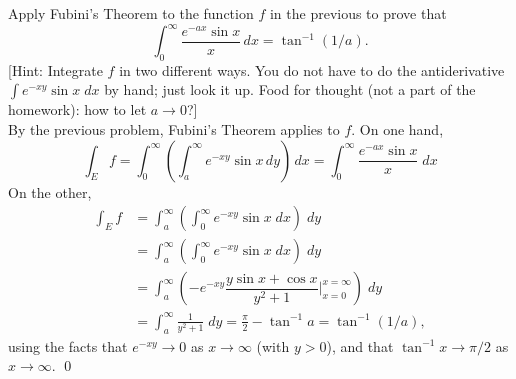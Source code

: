 \begin{hwsol}
Apply Fubini's Theorem to the function $f$ in the previous to prove that 
        \[
        \int_0^\infty \frac{e^{-ax} \sin x}{x} \,dx= \tan^{-1} (1/a).
        \]
[Hint: Integrate $f$ in two different ways. You do not have to do the antiderivative $\int e^{-xy}\sin x \;dx$ by hand; just look it up. Food for thought (not a part of the homework): how to let $a \to 0$?] \\

\pf By the previous problem, Fubini's Theorem applies to $f$. On one hand, 
        \[
        \int_E f= \int_0^\infty \left( \int_a^{\infty} e^{-xy}\sin x\,dy \right) \,dx= \int_0^\infty \frac{e^{-ax} \sin x}{x} \;dx
        \]
On the other, 
        \begin{align*}
        \int_E f&= \int_a^\infty \left( \int_0^{\infty} e^{-xy} \sin x \;dx \right) \;dy \\ 
         &= \int_a^\infty \left( \int_0^{\infty} e^{-xy} \sin x \;dx \right) \;dy \\
         &= \int_a^\infty \left( -e^{-xy} \dfrac{y \sin x + \cos x}{y^2+1} \bigg|_{x=0}^{x=\infty} \right) \;dy \\ 
         &= \int_a^\infty \frac{1}{y^2+1} \;dy= \frac{\pi}{2} - \tan^{-1}a= \tan^{-1}(1/a),
        \end{align*}
using the facts that $e^{-xy} \to 0$ as $x \to \infty$ (with $y>0$), and that $\tan^{-1} x \to \pi/2$ as $x \to \infty$. \qed \\
\end{hwsol}



